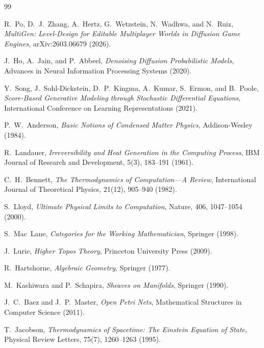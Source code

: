 \documentclass[11pt]{article}
\begin{document}
\newpage
\begin{thebibliography}{99}

R.~Po, D.~J.~Zhang, A.~Hertz, G.~Wetzstein, N.~Wadhwa, and N.~Ruiz,
\newblock \emph{MultiGen: Level-Design for Editable Multiplayer Worlds in
  Diffusion Game Engines},
\newblock arXiv:2603.06679 (2026).

J.~Ho, A.~Jain, and P.~Abbeel,
\newblock \emph{Denoising Diffusion Probabilistic Models},
\newblock Advances in Neural Information Processing Systems (2020).

Y.~Song, J.~Sohl-Dickstein, D.~P.~Kingma, A.~Kumar, S.~Ermon, and B.~Poole,
\newblock \emph{Score-Based Generative Modeling through Stochastic Differential
  Equations},
\newblock International Conference on Learning Representations (2021).

P.~W.~Anderson,
\newblock \emph{Basic Notions of Condensed Matter Physics},
\newblock Addison-Wesley (1984).

R.~Landauer,
\newblock \emph{Irreversibility and Heat Generation in the Computing Process},
\newblock IBM Journal of Research and Development, 5(3), 183--191 (1961).

C.~H.~Bennett,
\newblock \emph{The Thermodynamics of Computation---A Review},
\newblock International Journal of Theoretical Physics, 21(12), 905--940
  (1982).

S.~Lloyd,
\newblock \emph{Ultimate Physical Limits to Computation},
\newblock Nature, 406, 1047--1054 (2000).

S.~Mac~Lane,
\newblock \emph{Categories for the Working Mathematician},
\newblock Springer (1998).

J.~Lurie,
\newblock \emph{Higher Topos Theory},
\newblock Princeton University Press (2009).

R.~Hartshorne,
\newblock \emph{Algebraic Geometry},
\newblock Springer (1977).

M.~Kashiwara and P.~Schapira,
\newblock \emph{Sheaves on Manifolds},
\newblock Springer (1990).

J.~C.~Baez and J.~P.~Master,
\newblock \emph{Open Petri Nets},
\newblock Mathematical Structures in Computer Science (2011).

T.~Jacobson,
\newblock \emph{Thermodynamics of Spacetime: The Einstein Equation of State},
\newblock Physical Review Letters, 75(7), 1260--1263 (1995).


\end{thebibliography}
\end{document}

